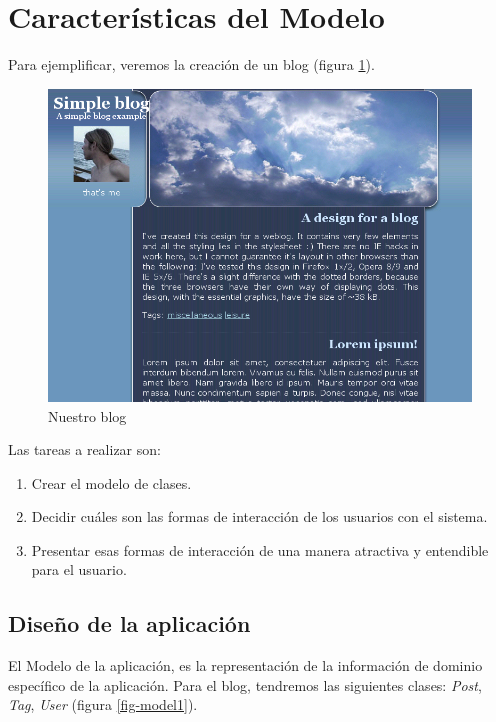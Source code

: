 \section{Características del Modelo}

Para ejemplificar, veremos la creación de un blog (figura \ref{fig-blog1}).

\begin{figure}[h]
	\centering
	\includegraphics[scale=0.6]{images/blog1.png}
 	\caption{Nuestro blog}
 	\label{fig-blog1}
\end{figure}

Las tareas a realizar son:
\begin{enumerate}
\item Crear el modelo de clases.
\item Decidir cuáles son las formas de interacción de los usuarios con el sistema.
\item Presentar esas formas de interacción de una manera atractiva y entendible para el usuario.
\end{enumerate}

\subsection{Diseño de la aplicación}

El Modelo de la aplicación, es la representación de la información de dominio específico de la aplicación. Para el blog, tendremos las siguientes clases: \emph{Post}, \emph{Tag}, \emph{User} (figura \ref{fig-model1}).

